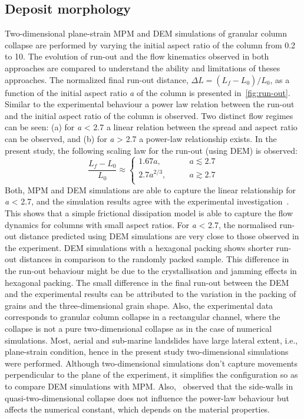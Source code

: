 \subsection{Deposit morphology}
Two-dimensional plane-strain MPM and DEM simulations of granular column 
collapse are performed by varying the initial aspect ratio of the column from 
0.2 to 10. The evolution of run-out and the flow kinematics observed in both 
approaches are compared to understand the ability and limitations of theses 
approaches. The normalized final run-out distance, $\Delta L = 
(L_{\textit{f}}-L_{\textit{0}})/L_{\textit{0}}$, as a function of the initial 
aspect ratio \textit{a} of the column is presented in~\cref{fig:run-out}. 
Similar to the experimental behaviour a power law relation between the run-out 
and the initial aspect ratio of the column is observed. Two distinct flow 
regimes can be seen: (a) for \textit{a} < 2.7 a linear relation between the 
spread and aspect ratio can be observed, and (b) for \textit{a} > 2.7 a 
power-law relationship exists. In the present study, the following scaling law 
for the run-out (using DEM) is observed:
%
\begin{equation}
\frac{L_{\textit{f}}-L_{\textit{0}}}{L_{\textit{0}}} \approx  
\begin{cases}
1.67 a, &\qquad \textit{a}\lesssim 2.7 \\
2.7 a^{2/3}, &\qquad \textit{a} \gtrsim 2.7 \\
\end{cases}
\end{equation}
Both, MPM and DEM simulations are able to capture the linear relationship for 
\textit{a} < 2.7, and the simulation results agree with the experimental 
investigation~\citep{Lajeunesse2005}. This shows that a simple frictional 
dissipation model is able to capture the flow dynamics for columns with small 
aspect ratios. For \textit{a} < 2.7, the normalised run-out distance predicted 
using DEM simulations are very close to those observed in the experiment. DEM 
simulations with a hexagonal packing shows shorter run-out distances in 
comparison to the randomly packed sample. This difference in the run-out 
behaviour might be due to the crystallisation and jamming effects in hexagonal 
packing. The small difference in the final run-out between the DEM and the 
experimental results can be attributed to the variation in the packing of 
grains and the three-dimensional grain shape. Also, the experimental data 
corresponds to granular column collapse in a rectangular channel, where the 
collapse is not a pure two-dimensional collapse as in the case of numerical 
simulations. Most, aerial and sub-marine landslides have large lateral extent, 
i.e., plane-strain condition, hence in the present study two-dimensional 
simulations were performed. Although two-dimensional simulations don't capture 
movements perpendicular to the plane of the experiment, it simplifies the 
configuration so as to compare DEM simulations with MPM. 
Also,~\citep{Balmforth2005} observed that the side-walls 
in quasi-two-dimensional collapse does not influence the power-law behaviour 
but affects the numerical constant, which depends on the material properties. 

